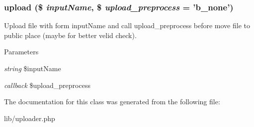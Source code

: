 \subsubsection[{upload}]{\setlength{\rightskip}{0pt plus 5cm}upload (\$ {\em inputName}, \/  \$ {\em upload\_\-preprocess} = {\ttfamily 'b\_\-none'})}\label{class_uploader_a0362e48fc390880c79c71d81c908ab86}
Upload file with form inputName and call upload\_\-preprocess before move file to public place (maybe for better velid check). 
\begin{DoxyParams}{Parameters}
\item[{\em string}]\$inputName \item[{\em callback}]\$upload\_\-preprocess \end{DoxyParams}


The documentation for this class was generated from the following file:\begin{DoxyCompactItemize}
\item 
lib/uploader.php\end{DoxyCompactItemize}
